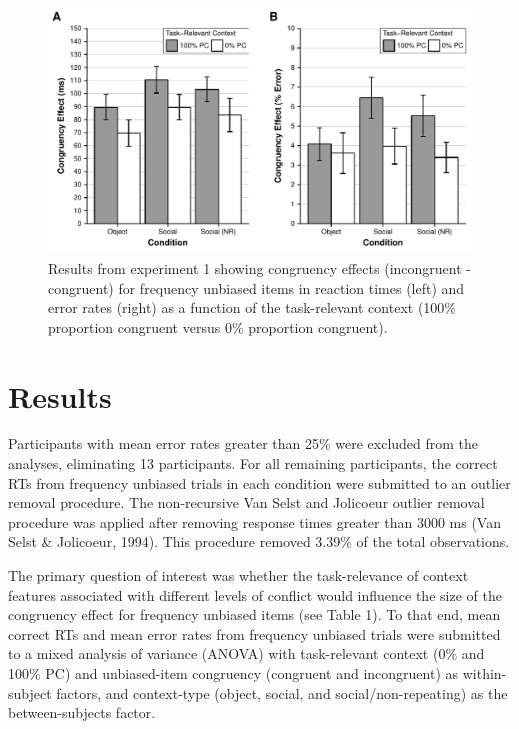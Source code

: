 \documentclass[english,,man,floatsintext]{apa6}
\begin{document}
\begin{figure}
\centering
\includegraphics{manuscript_files/figure-latex/figure2-1.pdf}
\caption{\label{fig:figure2}Results from experiment 1 showing congruency effects (incongruent - congruent) for frequency unbiased items in reaction times (left) and error rates (right) as a function of the task-relevant context (100\% proportion congruent versus 0\% proportion congruent).}
\end{figure}

\hypertarget{results}{%
\section{Results}\label{results}}

Participants with mean error rates greater than 25\% were excluded from the analyses, eliminating 13 participants. For all remaining participants, the correct RTs from frequency unbiased trials in each condition were submitted to an outlier removal procedure. The non-recursive Van Selst and Jolicoeur outlier removal procedure was applied after removing response times greater than 3000 ms (Van Selst \& Jolicoeur, 1994). This procedure removed 3.39\% of the total observations.

The primary question of interest was whether the task-relevance of context features associated with different levels of conflict would influence the size of the congruency effect for frequency unbiased items (see Table 1). To that end, mean correct RTs and mean error rates from frequency unbiased trials were submitted to a mixed analysis of variance (ANOVA) with task-relevant context (0\% and 100\% PC) and unbiased-item congruency (congruent and incongruent) as within-subject factors, and context-type (object, social, and social/non-repeating) as the between-subjects factor.
\end{document}
